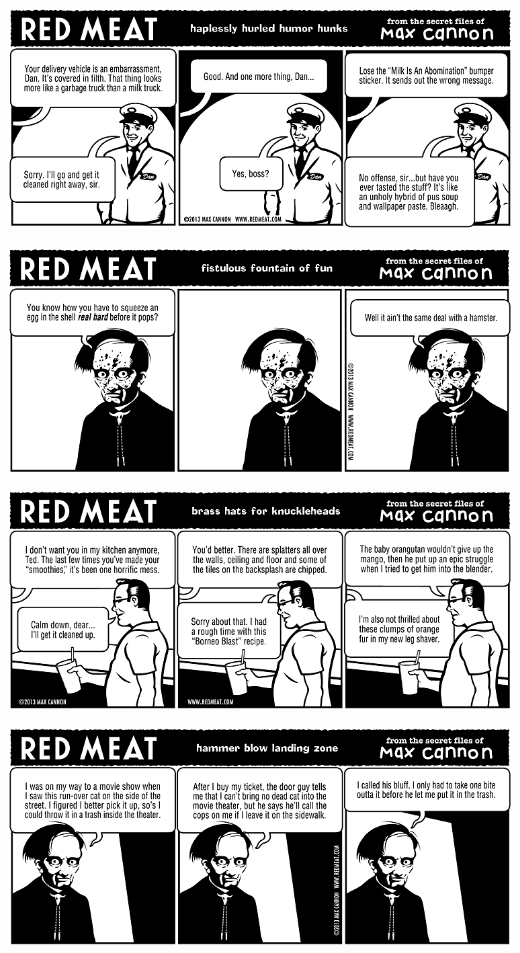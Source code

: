 \documentclass[a4paper,twoside,11pt]{article}
\begin{document}
\includegraphics[width=\textwidth]{redmeat_2013-05-28.png}



\includegraphics[width=\textwidth]{redmeat_2013-06-04.png}



\includegraphics[width=\textwidth]{redmeat_2013-06-11.png}



\includegraphics[width=\textwidth]{redmeat_2013-06-18.png}
\end{document}
